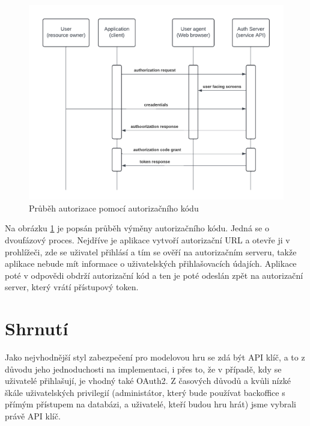 \begin{figure}[ht!]
    \centering
    \includegraphics[width=\textwidth]{figures/Oauth auth flow.pdf}
    \caption[short]{Průběh autorizace pomocí autorizačního kódu}%
    \label{fig:Oauth_auth_flow}
\end{figure}


Na obrázku \ref{fig:Oauth_auth_flow} je popsán průběh výměny autorizačního kódu.
Jedná se o dvoufázový proces.
Nejdříve je aplikace vytvoří autorizační URL a otevře ji v prohlížeči, zde se uživatel přihlásí a tím se ověří na autorizačním serveru, takže aplikace nebude mít informace o uživatelských přihlašovacích údajích. Aplikace poté v odpovědi obdrží autorizační kód a ten je poté odeslán zpět na autorizační server, který vrátí přístupový token.


\section{Shrnutí}
Jako nejvhodnější styl zabezpečení pro modelovou hru se zdá být API klíč, a to z důvodu jeho jednoduchosti na implementaci, i přes to, že v případě, kdy se uživatelé přihlašují, je vhodný také OAuth2. Z časových důvodů a kvůli nízké škále uživatelských privilegií (administátor, který bude používat backoffice s přímým přístupem na databázi, a uživatelé, kteří budou hru hrát) jsme vybrali právě API klíč.

